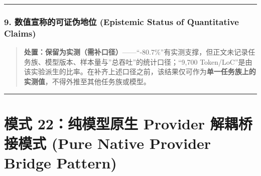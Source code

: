 \begin{Shaded}
\begin{Highlighting}[]
    \OperatorTok{=} \OperatorTok{;}
    \OperatorTok{\textgreater{}} \NormalTok{) \{}
        \NormalTok{(}\SpecialCharTok{$\{}\SpecialCharTok{\}}\VerbatimStringTok{ \textgreater{} }\SpecialCharTok{$\{}\SpecialCharTok{\}}\VerbatimStringTok{\textasciigrave{}}\NormalTok{)}\OperatorTok{;}
\NormalTok{    \}}

    \OperatorTok{;}
\NormalTok{  \}}
\NormalTok{\}}
\end{Highlighting}
\end{Shaded}

\begin{center}\rule{0.5\linewidth}{0.5pt}\end{center}

\subsubsection{9. 数值宣称的可证伪地位 (Epistemic Status of Quantitative
Claims)}\label{ux6570ux503cux5ba3ux79f0ux7684ux53efux8bc1ux4f2aux5730ux4f4d-epistemic-status-of-quantitative-claims-6}

\begin{quote}
\textbf{处置：保留为实测（需补口径）}------``-80.7\%''有实测支撑，但正文未记录任务族、模型版本、样本量与''总吞吐''的统计口径；``9,700
Token/LoC''是由该实验派生的比率。在补齐上述口径之前，该结果仅可作为\textbf{单一任务族上的实测值}，不得外推至其他任务族或模型。
\end{quote}

\begin{center}\rule{0.5\linewidth}{0.5pt}\end{center}

\section{模式 22：纯模型原生 Provider 解耦桥接模式 (Pure Native Provider
Bridge
Pattern)}\label{ux6a21ux5f0f-22ux7eafux6a21ux578bux539fux751f-provider-ux89e3ux8026ux6865ux63a5ux6a21ux5f0f-pure-native-provider-bridge-pattern}


